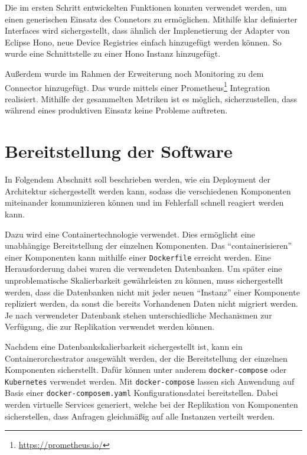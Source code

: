 Die im ersten Schritt entwickelten Funktionen konnten verwendet werden, um einen generischen Einsatz des Connetors zu ermöglichen. Mithilfe klar definierter Interfaces wird sichergestellt, dass ähnlich der Implenetierung der Adapter von Eclipse Hono, neue Device Registries einfach hinzugefügt werden können. So wurde eine Schnittstelle zu einer Hono Instanz hinzugefügt.

Außerdem wurde im Rahmen der Erweiterung noch Monitoring zu dem Connector hinzugefügt. Das wurde mittels einer Prometheus\footnote{\url{https://prometheus.io/}} Integration realisiert. Mithilfe der gesammelten Metriken ist es möglich, sicherzustellen, dass während eines produktiven Einsatz keine Probleme auftreten.\autocite{boncea2016system}

\section{Bereitstellung der Software}

In Folgendem Abschnitt soll beschrieben werden, wie ein Deployment der Architektur sichergestellt werden kann, sodass die verschiedenen Komponenten miteinander kommunizieren können und im Fehlerfall schnell reagiert werden kann.

Dazu wird eine Containertechnologie verwendet. Dies ermöglicht eine unabhängige Bereitstellung der einzelnen Komponenten. Das \enquote{containerisieren} einer Komponenten kann mithilfe einer \texttt{Dockerfile} erreicht werden. Eine Herausforderung dabei waren die verwendeten Datenbanken. Um später eine unproblematische Skalierbarkeit gewährleisten zu können, muss sichergestellt werden, dass die Datenbanken nicht mit jeder neuen \enquote{Instanz} einer Komponente repliziert werden, da sonst die bereits Vorhandenen Daten nicht migriert werden. Je nach verwendeter Datenbank stehen unterschiedliche Mechanismen zur Verfügung, die zur Replikation verwendet werden können.

Nachdem eine Datenbankskalierbarkeit sichergestellt ist, kann ein Containerorchestrator ausgewählt werden, der die Bereitstellung der einzelnen Komponenten sicherstellt. Dafür können unter anderem \texttt{docker-compose} oder \texttt{Kubernetes} verwendet werden. Mit \texttt{docker-compose} lassen sich Anwendung auf Basis einer \texttt{docker-composem.yaml} Konfigurationsdatei bereitstellen. Dabei werden virtuelle Services generiert, welche bei der Replikation von Komponenten sicherstellen, dass Anfragen gleichmäßig auf alle Instanzen verteilt werden. 
